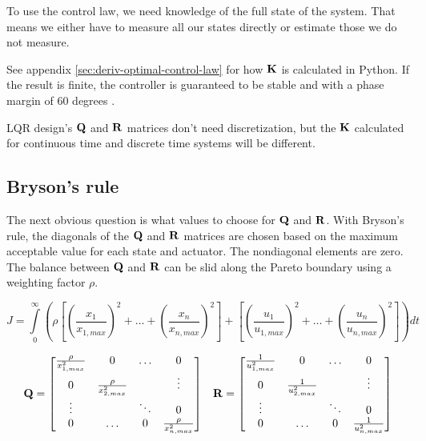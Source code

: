 To use the control law, we need knowledge of the full state of the system. That
means we either have to measure all our states directly or estimate those we do
not measure.

See appendix \ref{sec:deriv-optimal-control-law} for how $\mathbf{K}$ is calculated
in Python. If the result is finite, the controller is guaranteed to be stable
and  with a \gls{phase margin} of 60 degrees
\cite{bib:lqr-phase-margin}.

\begin{remark}
  LQR design's $\mathbf{Q}$ and $\mathbf{R}$ matrices don't need discretization, but
  the $\mathbf{K}$ calculated for continuous time and discrete time systems
  will be different.
\end{remark}

\subsection{Bryson's rule}

The next obvious question is what values to choose for $\mathbf{Q}$ and $\mathbf{R}$.
With Bryson's rule, the diagonals of the $\mathbf{Q}$ and $\mathbf{R}$ matrices are
chosen based on the maximum acceptable value for each \gls{state} and actuator.
The nondiagonal elements are zero. The balance between $\mathbf{Q}$ and $\mathbf{R}$
can be slid along the Pareto boundary using a weighting factor $\rho$.

\begin{equation*}
  J = \int\limits_0^\infty \left(\rho \left[
    \left(\frac{x_1}{x_{1,max}}\right)^2 + \ldots +
    \left(\frac{x_n}{x_{n,max}}\right)^2\right] + \left[
    \left(\frac{u_1}{u_{1,max}}\right)^2 + \ldots +
    \left(\frac{u_n}{u_{n,max}}\right)^2\right]\right) dt
\end{equation*}

\begin{equation*}
  \begin{array}{cc}
    \mathbf{Q} = \begin{bmatrix}
      \frac{\rho}{x_{1,max}^2} & 0 & \ldots & 0 \\
      0 & \frac{\rho}{x_{2,max}^2} & & \vdots \\
      \vdots & & \ddots & 0 \\
      0 & \ldots & 0 & \frac{\rho}{x_{n,max}^2}
    \end{bmatrix} &
    \mathbf{R} = \begin{bmatrix}
      \frac{1}{u_{1,max}^2} & 0 & \ldots & 0 \\
      0 & \frac{1}{u_{2,max}^2} & & \vdots \\
      \vdots & & \ddots & 0 \\
      0 & \ldots & 0 & \frac{1}{u_{n,max}^2}
    \end{bmatrix}
  \end{array}
\end{equation*}

